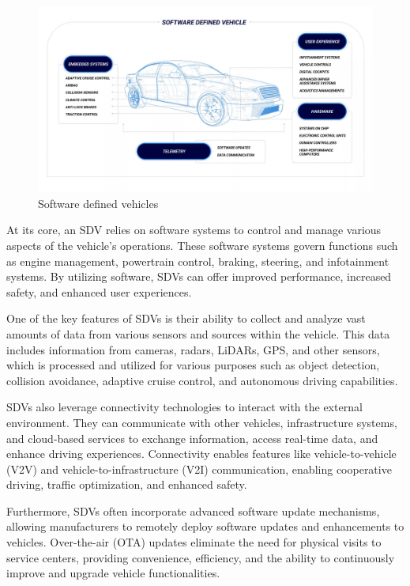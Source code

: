\documentclass[
12pt,
oneside, 
onehalfspacing, 
nolistspacing, 
parskip, 
chapterinoneline, 
]{AASTCOMPUTER}
\begin{document}
\begin{figure}[!ht]
	\centering
	\includegraphics[scale=0.32]{Figures/Product/SDV.png}
  	\caption{Software defined vehicles}
  	\label{fig:Software defined vehicles}
\end{figure}

At its core, an SDV relies on software systems to control and manage various aspects of the vehicle's operations. These software systems govern functions such as engine management, powertrain control, braking, steering, and infotainment systems. By utilizing software, SDVs can offer improved performance, increased safety, and enhanced user experiences.

One of the key features of SDVs is their ability to collect and analyze vast amounts of data from various sensors and sources within the vehicle. This data includes information from cameras, radars, LiDARs, GPS, and other sensors, which is processed and utilized for various purposes such as object detection, collision avoidance, adaptive cruise control, and autonomous driving capabilities.

SDVs also leverage connectivity technologies to interact with the external environment. They can communicate with other vehicles, infrastructure systems, and cloud-based services to exchange information, access real-time data, and enhance driving experiences. Connectivity enables features like vehicle-to-vehicle (V2V) and vehicle-to-infrastructure (V2I) communication, enabling cooperative driving, traffic optimization, and enhanced safety.

Furthermore, SDVs often incorporate advanced software update mechanisms, allowing manufacturers to remotely deploy software updates and enhancements to vehicles. Over-the-air (OTA) updates eliminate the need for physical visits to service centers, providing convenience, efficiency, and the ability to continuously improve and upgrade vehicle functionalities.
\end{document}
